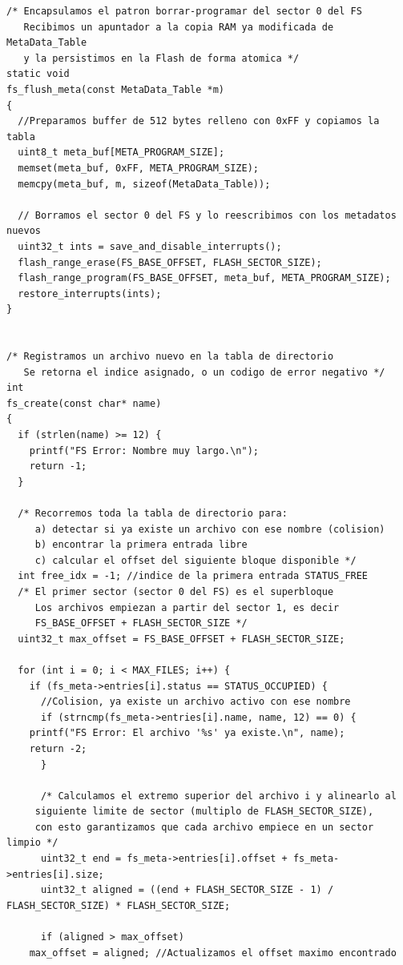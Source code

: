 \documentclass[12pt,letterpaper]{article}
\begin{document}
\begin{lstlisting}[style=modernc, caption={Módulo 2: registro de un nuevo archivo con alineación a sectores}]
/* Encapsulamos el patron borrar-programar del sector 0 del FS
   Recibimos un apuntador a la copia RAM ya modificada de MetaData_Table
   y la persistimos en la Flash de forma atomica */
static void
fs_flush_meta(const MetaData_Table *m)
{
  //Preparamos buffer de 512 bytes relleno con 0xFF y copiamos la tabla
  uint8_t meta_buf[META_PROGRAM_SIZE];
  memset(meta_buf, 0xFF, META_PROGRAM_SIZE);
  memcpy(meta_buf, m, sizeof(MetaData_Table));
  
  // Borramos el sector 0 del FS y lo reescribimos con los metadatos nuevos
  uint32_t ints = save_and_disable_interrupts();
  flash_range_erase(FS_BASE_OFFSET, FLASH_SECTOR_SIZE);
  flash_range_program(FS_BASE_OFFSET, meta_buf, META_PROGRAM_SIZE);
  restore_interrupts(ints);
}


/* Registramos un archivo nuevo en la tabla de directorio
   Se retorna el indice asignado, o un codigo de error negativo */
int
fs_create(const char* name)
{
  if (strlen(name) >= 12) {
    printf("FS Error: Nombre muy largo.\n");
    return -1;
  }
  
  /* Recorremos toda la tabla de directorio para:
     a) detectar si ya existe un archivo con ese nombre (colision)
     b) encontrar la primera entrada libre
     c) calcular el offset del siguiente bloque disponible */
  int free_idx = -1; //indice de la primera entrada STATUS_FREE
  /* El primer sector (sector 0 del FS) es el superbloque
     Los archivos empiezan a partir del sector 1, es decir
     FS_BASE_OFFSET + FLASH_SECTOR_SIZE */
  uint32_t max_offset = FS_BASE_OFFSET + FLASH_SECTOR_SIZE;

  for (int i = 0; i < MAX_FILES; i++) {
    if (fs_meta->entries[i].status == STATUS_OCCUPIED) {
      //Colision, ya existe un archivo activo con ese nombre
      if (strncmp(fs_meta->entries[i].name, name, 12) == 0) {
	printf("FS Error: El archivo '%s' ya existe.\n", name);
	return -2;
      }

      /* Calculamos el extremo superior del archivo i y alinearlo al
	 siguiente limite de sector (multiplo de FLASH_SECTOR_SIZE),
	 con esto garantizamos que cada archivo empiece en un sector limpio */
      uint32_t end = fs_meta->entries[i].offset + fs_meta->entries[i].size;
      uint32_t aligned = ((end + FLASH_SECTOR_SIZE - 1) / FLASH_SECTOR_SIZE) * FLASH_SECTOR_SIZE;
      
      if (aligned > max_offset)
	max_offset = aligned; //Actualizamos el offset maximo encontrado
      

\end{lstlisting}
\end{document}
